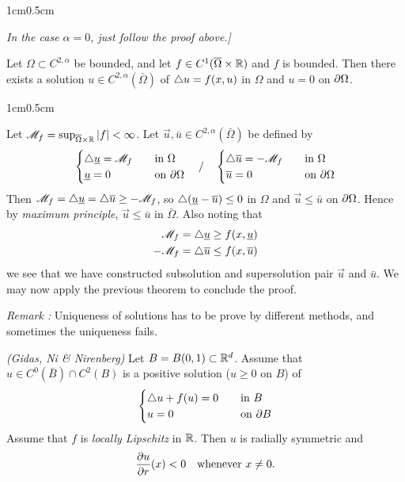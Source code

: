 \documentclass[12pt,a4paper]{article}
\newenvironment{proof}
{\begin{changemargin}{1cm}{0.5cm} 
	}%
	{\end{changemargin}
}
\newenvironment{p}
{\begin{proof} 
	}%
	{\end{proof}
}
\begin{document}
\begin{p}
\emph{In the case $\alpha =0$, just follow the proof above.]}

\eop
\end{p}
\s


\corr Let $\Omega \subset C^{2, \alpha}$ be bounded, and let $f\in C^1(\overline{\Omega} \times \mathbb{R})$ and $f$ is bounded. Then there exists a solution $u \in C^{2, \alpha}(\bar{\Omega})$ of $\triangle u = f(x, u)$ in $\Omega$ and $u=0$ on $\partial \Omega$.
\begin{p}
\pf Let $\mathscr{M}_f = \sup_{\overline{\Omega}\times \mathbb{R}} |f| <\infty$. Let $\vec{u}, \bar{u} \in C^{2, \alpha}(\bar{\Omega})$ be defined by
\begin{align*}
\begin{cases}
\triangle \underline{u} = \mathscr{M}_f \quad & \text{in } \Omega\\
\underline{u} = 0 \quad & \text{on }\partial \Omega
\end{cases} \quad / \quad \begin{cases}
\triangle \overline{u} = -\mathscr{M}_f \quad & \text{in } \Omega\\
\overline{u} = 0 \quad & \text{on }\partial \Omega
\end{cases}
\end{align*}
Then $\mathscr{M}_f = \triangle \underline{u} = \triangle \overline{u} \geq - \mathscr{M}_f$, so $\triangle(\underline{u} - \overline{u})\leq 0$ in $\Omega$ and $\vec{u} \leq \bar{u}$ on $\partial \Omega$. Hence by \emph{maximum principle}, $\vec{u}\leq \bar{u}$ in $\bar{\Omega}$. Also noting that
\begin{align*}
\mathscr{M}_f  = \triangle \underline{u}\geq f(x, \underline{u}) \\
- \mathscr{M}_f = \triangle \overline{u} \leq f(x, \overline{u})
\end{align*}
we see that we have constructed subsolution and supersolution pair $\vec{u}$ and $\bar{u}$. We may now apply the previous theorem to conclude the proof.

\eop
\end{p}
\s

\emph{Remark :} Uniqueness of solutions has to be prove by different methods, and sometimes the uniqueness fails.
\s

\thm \emph{(Gidas, Ni \& Nirenberg)} Let $B= B(0,1) \subset \mathbb{R}^d$. Assume that $u\in C^0(\bar{B})\cap C^2(B)$ is a positive solution ($u\geq 0$ on $B$) of
\begin{align*}
\begin{cases}
\triangle u + f(u) =0 \quad & \text{in }B\\
u = 0 \quad & \text{on }\partial B
\end{cases}
\end{align*}
Assume that $f$ is \emph{locally Lipschitz} in $\mathbb{R}$. Then $u$ is radially symmetric and 
\begin{align*}
\frac{\partial u}{\partial r}(x) < 0 \quad \text{whenever } x\neq 0.
\end{align*}
\s
\end{document}
